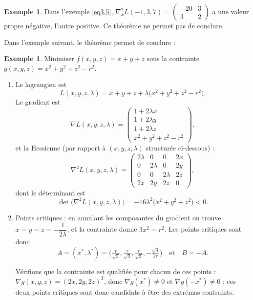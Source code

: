 \documentclass[a4paper,12pt,openany]{book}
\theoremstyle{plain}
\theoremstyle{definition}
\newtheorem{example}[theorem]{Exemple}
\theoremstyle{remark}
\theoremstyle{nbstyle}
\begin{document}
	\begin{example}\label{ex:3.6}
		Dans l'exemple \eqref{eq3.5}, \(\nabla^2_x L(-1,3,7)=
		\begin{pmatrix}
		-20 & 3\\
		3 & 2
		\end{pmatrix}\)
		a une valeur propre négative, l'autre positive. Ce théorème ne permet pas de conclure.
	\end{example}
	
	Dans l'exemple suivant, le théorème permet de conclure :
	
	\begin{example}\label{ex:3.7}
		Minimiser \(f(x,y,z)=x+y+z\) sous la contrainte \(g(x,y,z)=x^2+y^2+z^2-r^2\).
		
		\begin{enumerate}
			\item Le lagrangien est
			\[
			L(x,y,z,\lambda)=x+y+z+\lambda\big(x^2+y^2+z^2-r^2\big).
			\]
			Le gradient est
			\[
			\nabla L(x,y,z,\lambda)=
			\begin{pmatrix}
			1+2\lambda x\\[4pt]
			1+2\lambda y\\[4pt]
			1+2\lambda z\\[4pt]
			x^2+y^2+z^2-r^2
			\end{pmatrix},
			\]
			et la Hessienne (par rapport à \((x,y,z,\lambda)\) structurée ci-dessous) :
			\[
			\nabla^2 L(x,y,z,\lambda)=
			\begin{pmatrix}
			2\lambda & 0 & 0 & 2x\\
			0 & 2\lambda & 0 & 2y\\
			0 & 0 & 2\lambda & 2z\\
			2x & 2y & 2z & 0
			\end{pmatrix},
			\]
			dont le déterminant est
			\[
			\det\big(\nabla^2 L(x,y,z,\lambda)\big) = -16\lambda^2\big(x^2+y^2+z^2\big) < 0.
			\]
			
			\item Points critiques : en annulant les composantes du gradient on trouve
			\(x=y=z=-\dfrac{1}{2\lambda}\), et la contrainte donne \(3x^2=r^2\). Les points critiques sont donc
			\[
			A=(x^*,\lambda^*)=\Big(\tfrac{r}{\sqrt{3}},\tfrac{r}{\sqrt{3}},\tfrac{r}{\sqrt{3}}, -\tfrac{\sqrt{3}}{2r}\Big)
			\quad\text{et}\quad B=-A.
			\]
			
			Vérifions que la contrainte est qualifiée pour chacun de ces points : \(\nabla g(x,y,z) = (2x,2y,2z)^T\),
			donc \(\nabla g(x^*)\neq 0\) et \(\nabla g(-x^*)\neq 0\) ; ces deux points critiques sont donc candidats à être des extrémas contraints.
			

\end{enumerate}
\end{example}
\end{document}
